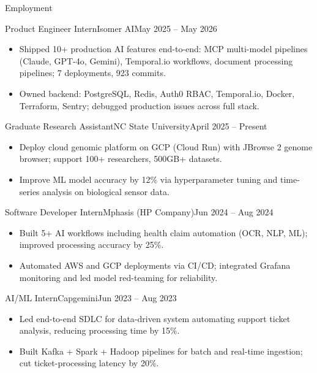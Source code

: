 \documentclass[]{mcdowellcv}
\begin{document}
\makeheader

\begin{cvsection}{Employment}
  \begin{cvsubsection}{Product Engineer Intern}{Isomer AI}{May 2025 -- May 2026}
    \begin{itemize}
      \item Shipped 10+ production AI features end-to-end: MCP multi-model pipelines (Claude, GPT-4o, Gemini), Temporal.io workflows, document processing pipelines; 7 deployments, 923 commits.
      \item Owned backend: PostgreSQL, Redis, Auth0 RBAC, Temporal.io, Docker, Terraform, Sentry; debugged production issues across full stack.
    \end{itemize}
    \vspace{-1.5pt}
  \end{cvsubsection}

  \begin{cvsubsection}{Graduate Research Assistant}{NC State University}{April 2025 -- Present}
    \begin{itemize}
      \item Deploy cloud genomic platform on GCP (Cloud Run) with JBrowse 2 genome browser; support 100+ researchers, 500GB+ datasets.
      \item Improve ML model accuracy by 12\% via hyperparameter tuning and time-series analysis on biological sensor data.
    \end{itemize}
    \vspace{-1.5pt}
  \end{cvsubsection}

  \begin{cvsubsection}{Software Developer Intern}{Mphasis (HP Company)}{Jun 2024 -- Aug 2024}
    \begin{itemize}
      \item Built 5+ AI workflows including health claim automation (OCR, NLP, ML); improved processing accuracy by 25\%.
      \item Automated AWS and GCP deployments via CI/CD; integrated Grafana monitoring and led model red-teaming for reliability.
    \end{itemize}
    \vspace{-1.5pt}
  \end{cvsubsection}

  \begin{cvsubsection}{AI/ML Intern}{Capgemini}{Jun 2023 -- Aug 2023}
    \begin{itemize}
      \item Led end-to-end SDLC for data-driven system automating support ticket analysis, reducing processing time by 15\%.
      \item Built Kafka + Spark + Hadoop pipelines for batch and real-time ingestion; cut ticket-processing latency by 20\%.
    \end{itemize}
    \vspace{-1.5pt}
  \end{cvsubsection}
\end{cvsection}
\end{document}
